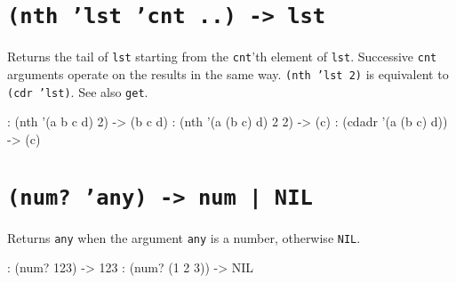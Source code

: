  
\section*{\texttt{(nth 'lst 'cnt ..) -> lst}}
\label{sec:func-ref-N-(nth 'lst 'cnt ..) -> lst}


Returns the tail of \texttt{lst} starting from the \texttt{cnt}'th element of \texttt{lst}.
Successive \texttt{cnt} arguments operate on the results in the same way.
\texttt{(nth 'lst 2)} is equivalent to \texttt{(cdr 'lst)}. See also \texttt{get}.


\begin{wideverbatim}
: (nth '(a b c d) 2)
-> (b c d)
: (nth '(a (b c) d) 2 2)
-> (c)
: (cdadr '(a (b c) d))
-> (c)
\end{wideverbatim}

 
\section*{\texttt{(num? 'any) -> num | NIL}}
\label{sec:func-ref-N-(num? 'any) -> num | NIL}


Returns \texttt{any} when the argument \texttt{any} is a number, otherwise \texttt{NIL}.


\begin{wideverbatim}
: (num? 123)
-> 123
: (num? (1 2 3))
-> NIL
\end{wideverbatim}



% 
